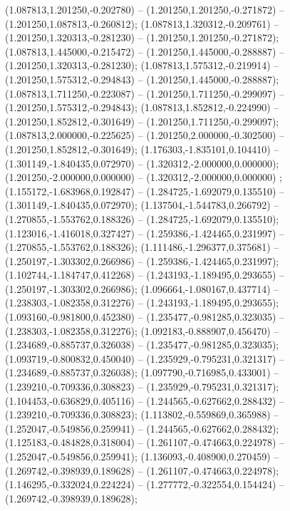  (1.087813,1.201250,-0.202780) -- (1.201250,1.201250,-0.271872) -- (1.201250,1.087813,-0.260812);
 (1.087813,1.320312,-0.209761) -- (1.201250,1.320313,-0.281230) -- (1.201250,1.201250,-0.271872);
 (1.087813,1.445000,-0.215472) -- (1.201250,1.445000,-0.288887) -- (1.201250,1.320313,-0.281230);
 (1.087813,1.575312,-0.219914) -- (1.201250,1.575312,-0.294843) -- (1.201250,1.445000,-0.288887);
 (1.087813,1.711250,-0.223087) -- (1.201250,1.711250,-0.299097) -- (1.201250,1.575312,-0.294843);
 (1.087813,1.852812,-0.224990) -- (1.201250,1.852812,-0.301649) -- (1.201250,1.711250,-0.299097);
 (1.087813,2.000000,-0.225625) -- (1.201250,2.000000,-0.302500) -- (1.201250,1.852812,-0.301649);
 (1.176303,-1.835101,0.104410) -- (1.301149,-1.840435,0.072970) -- (1.320312,-2.000000,0.000000);
 (1.201250,-2.000000,0.000000) -- (1.320312,-2.000000,0.000000) ;
 (1.155172,-1.683968,0.192847) -- (1.284725,-1.692079,0.135510) -- (1.301149,-1.840435,0.072970);
 (1.137504,-1.544783,0.266792) -- (1.270855,-1.553762,0.188326) -- (1.284725,-1.692079,0.135510);
 (1.123016,-1.416018,0.327427) -- (1.259386,-1.424465,0.231997) -- (1.270855,-1.553762,0.188326);
 (1.111486,-1.296377,0.375681) -- (1.250197,-1.303302,0.266986) -- (1.259386,-1.424465,0.231997);
 (1.102744,-1.184747,0.412268) -- (1.243193,-1.189495,0.293655) -- (1.250197,-1.303302,0.266986);
 (1.096664,-1.080167,0.437714) -- (1.238303,-1.082358,0.312276) -- (1.243193,-1.189495,0.293655);
 (1.093160,-0.981800,0.452380) -- (1.235477,-0.981285,0.323035) -- (1.238303,-1.082358,0.312276);
 (1.092183,-0.888907,0.456470) -- (1.234689,-0.885737,0.326038) -- (1.235477,-0.981285,0.323035);
 (1.093719,-0.800832,0.450040) -- (1.235929,-0.795231,0.321317) -- (1.234689,-0.885737,0.326038);
 (1.097790,-0.716985,0.433001) -- (1.239210,-0.709336,0.308823) -- (1.235929,-0.795231,0.321317);
 (1.104453,-0.636829,0.405116) -- (1.244565,-0.627662,0.288432) -- (1.239210,-0.709336,0.308823);
 (1.113802,-0.559869,0.365988) -- (1.252047,-0.549856,0.259941) -- (1.244565,-0.627662,0.288432);
 (1.125183,-0.484828,0.318004) -- (1.261107,-0.474663,0.224978) -- (1.252047,-0.549856,0.259941);
 (1.136093,-0.408900,0.270459) -- (1.269742,-0.398939,0.189628) -- (1.261107,-0.474663,0.224978);
 (1.146295,-0.332024,0.224224) -- (1.277772,-0.322554,0.154424) -- (1.269742,-0.398939,0.189628);
